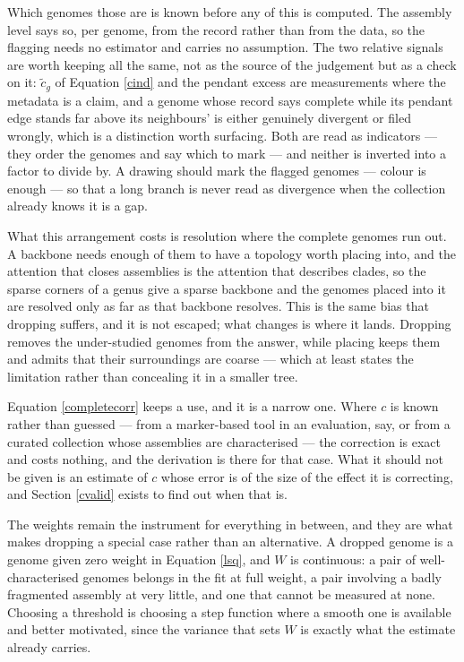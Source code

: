 \documentclass[pdflatex,sn-vancouver-num]{sn-jnl}
\begin{document}
Which genomes those are is known before any of this is computed. The assembly level says so, per
genome, from the record rather than from the data, so the flagging needs no estimator and carries no
assumption. The two relative signals are worth keeping all the same, not as the source of the
judgement but as a check on it: $\tilde{c}_g$ of Equation \eqref{cind} and the pendant excess are
measurements where the metadata is a claim, and a genome whose record says complete while its pendant
edge stands far above its neighbours' is either genuinely divergent or filed wrongly, which is a
distinction worth surfacing. Both are read as indicators --- they order the genomes and say which to
mark --- and neither is inverted into a factor to divide by. A
drawing should mark the flagged genomes --- colour is enough --- so that a long branch is never read
as divergence when the collection already knows it is a gap.

What this arrangement costs is resolution where the complete genomes run out. A backbone needs enough
of them to have a topology worth placing into, and the attention that closes assemblies is the
attention that describes clades, so the sparse corners of a genus give a sparse backbone and the
genomes placed into it are resolved only as far as that backbone resolves. This is the same bias that
dropping suffers, and it is not escaped; what changes is where it lands. Dropping removes the
under-studied genomes from the answer, while placing keeps them and admits that their surroundings are
coarse --- which at least states the limitation rather than concealing it in a smaller tree.

Equation \eqref{completecorr} keeps a use, and it is a narrow one. Where $c$ is known rather than
guessed --- from a marker-based tool in an evaluation, say, or from a curated collection whose
assemblies are characterised --- the correction is exact and costs nothing, and the derivation is
there for that case. What it should not be given is an estimate of $c$ whose error is of the size of
the effect it is correcting, and Section \ref{cvalid} exists to find out when that is.

The weights remain the instrument for everything in between, and they are what makes dropping a
special case rather than an alternative. A dropped genome is a genome given zero weight in
Equation \eqref{lsq}, and $W$ is continuous: a pair of well-characterised genomes belongs in the fit
at full weight, a pair involving a badly fragmented assembly at very little, and one that cannot be
measured at none. Choosing a threshold is choosing a step function where a smooth one is available and
better motivated, since the variance that sets $W$ is exactly what the estimate already carries.
\end{document}
